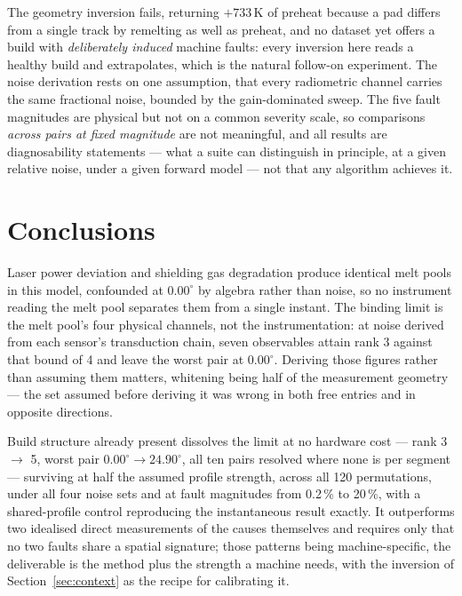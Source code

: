 \documentclass[preprint,times]{elsarticle}
\begin{document}
The geometry inversion fails, returning $+733$\,K of preheat because a pad
differs from a single track by remelting as well as preheat, and no dataset yet
offers a build with \emph{deliberately induced} machine faults: every inversion
here reads a healthy build and extrapolates, which is the natural follow-on
experiment. The noise derivation rests on one assumption, that every radiometric
channel carries the same fractional noise, bounded by the gain-dominated sweep.
The five fault magnitudes are physical but not on a common severity scale, so
comparisons \emph{across pairs at fixed magnitude} are not meaningful, and all
results are diagnosability statements --- what a suite can distinguish in
principle, at a given relative noise, under a given forward model --- not that
any algorithm achieves it.

\section{Conclusions}

Laser power deviation and shielding gas degradation produce identical melt pools
in this model, confounded at $0.00^\circ$ by algebra rather than noise, so no
instrument reading the melt pool separates them from a single instant. The
binding limit is the melt pool's four physical channels, not the instrumentation:
at noise derived from each sensor's transduction chain, seven observables attain
rank 3 against that bound of 4 and leave the worst pair at $0.00^\circ$. Deriving
those figures rather than assuming them matters, whitening being half of the
measurement geometry --- the set assumed before deriving it was wrong in both
free entries and in opposite directions.

Build structure already present dissolves the limit at no hardware cost --- rank
3 $\rightarrow$ 5, worst pair $0.00^\circ \rightarrow 24.90^\circ$, all ten pairs
resolved where none is per segment --- surviving at half the assumed profile
strength, across all 120 permutations, under all four noise sets and at fault
magnitudes from 0.2\,\% to 20\,\%, with a shared-profile control reproducing the
instantaneous result exactly. It outperforms two idealised direct measurements of
the causes themselves and requires only that no two faults share a spatial
signature; those patterns being machine-specific, the deliverable is the method
plus the strength a machine needs, with the inversion of
Section~\ref{sec:context} as the recipe for calibrating it.
\end{document}
